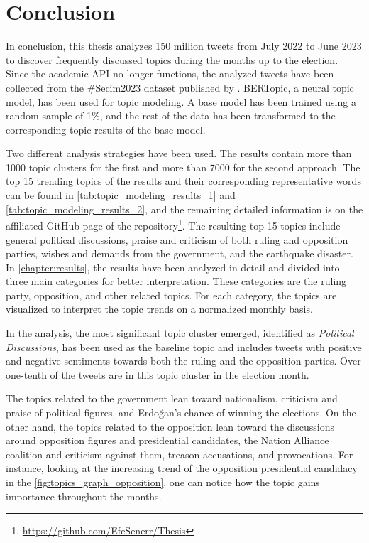 
\chapter{Conclusion}\label{chapter:conclusion}

In conclusion, this thesis analyzes 150 million tweets from July 2022 to June 2023 to discover 
frequently discussed topics during the months up to the election. Since the academic API no longer 
functions, the analyzed tweets have been collected from the \#Secim2023 dataset published by 
\textcite{secim2023}. BERTopic, a neural topic model, has been used for topic modeling. A base 
model has been trained using a random sample of 1\%, and the rest of the data has been transformed 
to the corresponding topic results of the base model.

Two different analysis strategies have been used. The results contain more than 1000 topic clusters for 
the first and more than 7000 for the second approach. The top 15 trending topics of the results and 
their corresponding representative words can be found in 
\autoref{tab:topic_modeling_results_1} and \autoref{tab:topic_modeling_results_2}, and the remaining 
detailed information is on the affiliated GitHub page of the 
repository\footnote{\url{https://github.com/EfeSenerr/Thesis}}. The resulting top 15 topics include general 
political discussions, praise and criticism of both ruling and opposition parties, wishes and demands from 
the government, and the earthquake disaster. In \autoref{chapter:results}, the results have been 
analyzed in detail and divided into three main categories for better interpretation. These categories 
are the ruling party, opposition, and other related topics. For each category, the topics are 
visualized to interpret the topic trends on a normalized monthly basis. 

In the analysis, the most significant topic cluster emerged, identified as 
\textit{Political Discussions}, has been used as the baseline topic and includes tweets with positive 
and negative sentiments towards both the ruling and the opposition parties. Over one-tenth of the 
tweets are in this topic cluster in the election month. 

The topics related to the government lean toward nationalism, criticism and praise of political 
figures, and Erdoğan's chance of winning the elections.
On the other hand, the topics related to the opposition lean toward the discussions around opposition 
figures and 
presidential candidates, the Nation Alliance coalition and criticism against them, treason accusations,
and provocations. For instance, looking at the increasing trend of the opposition presidential 
candidacy in the \autoref{fig:topics_graph_opposition}, one can notice how the topic gains importance 
throughout the months. 

